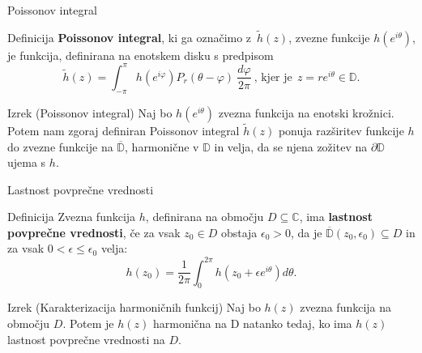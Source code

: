 \documentclass{beamer}
\newcommand{\C}{\mathbb C}
\theoremstyle{definition}
\theoremstyle{definition}
\begin{document}
\begin{frame}{Poissonov integral}
   \begin{block}{Definicija}
      \textbf{Poissonov integral}, ki ga označimo z~$\widetilde{h}(z)$, zvezne funkcije $h(e^{i\theta})$, je funkcija, definirana na enotskem disku s predpisom
      $$
      \widetilde{h}(z) = \int_{-\pi}^{\pi}{h(e^{i\varphi}) P_r(\theta - \varphi)~\frac{d\varphi}{2 \pi}}~\text{, kjer je}~~z = r e^{i\theta} \in \mathbb{D}.
      $$
   \end{block}
   \pause
   \begin{exampleblock}{Izrek (Poissonov integral)}
      Naj bo $h(e^{i \theta})$ zvezna funkcija na enotski krožnici. 
      Potem nam zgoraj definiran Poissonov integral $\widetilde{h}(z)$ ponuja razširitev funkcije $h$ do zvezne funkcije na $\overline{\mathbb{D}}$, harmonične v $\mathbb{D}$ in velja, da
      se njena zožitev na $\partial \mathbb{D}$ ujema s $h$.
   \end{exampleblock}
\end{frame}

\begin{frame}{Lastnost povprečne vrednosti}
   \begin{block}{Definicija} 
      Zvezna funkcija $h$, definirana na območju $D \subseteq \C$, ima \textbf{lastnost povprečne vrednosti}, če za vsak $z_0 \in D$ obstaja $\epsilon_0 > 0$, da je $\overline{\mathbb{D}}(z_0, \epsilon_0) \subseteq D$ in za vsak $0 < \epsilon \leq \epsilon_0 $ velja:
      $$
          h(z_0) = \frac{1}{2 \pi} \int_{0}^{2 \pi}{h(z_0 + \epsilon e^{i \theta}) d\theta}.
      $$
   \end{block}
   \pause
   \begin{exampleblock}{Izrek (Karakterizacija harmoničnih funkcij)}
      Naj bo $h(z)$ zvezna funkcija na območju $D$. 
      Potem je $h(z)$ harmonična na D natanko tedaj, ko ima $h(z)$ lastnost povprečne vrednosti na $D$.
   \end{exampleblock}
\end{frame}
\end{document}
